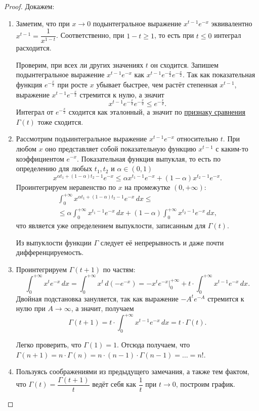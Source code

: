 \begin{proof}
	Докажем:
	\begin{enumerate}
		\item Заметим, что при \(x \to 0\) подынтегральное выражение \(x^{t - 1} e^{-x}\) эквивалентно \(x^{t - 1} = \dfrac{1}{x^{1 - t}}\). Соответственно, при \(1 - t \geqslant 1\), то есть при \(t \leqslant 0\) интеграл расходится.
		
		Проверим, при всех ли других значениях \(t\) он сходится. Запишем подынтегральное выражение \(x^{t - 1} e^{-x}\) как \(x^{t - 1} e^{-\frac{x}{2}} e^{-\frac{x}{2}}\). Так как показательная функция \(e^{-\frac{x}{2}}\) при росте \(x\) убывает быстрее, чем растёт степенная \(x^{t - 1}\), выражение \(x^{t - 1} e^{-\frac{x}{2}}\) стремится к нулю, а значит \[
			x^{t - 1} e^{-\frac{x}{2}} e^{-\frac{x}{2}} \leqslant  e^{-\frac{x}{2}}.
		\]
		Интеграл от \(e^{-\frac{x}{2}}\) сходится как эталонный, а значит по \hyperlink{priz}{признаку сравнения} \(\Gamma(t)\) тоже сходится.
		\item Рассмотрим подыинтегральное выражение \(x^{t - 1} e^{-x}\) относительно \(t\). При любом \(x\) оно представляет собой показательную функцию \(x^{t - 1}\) с каким-то коэффициентом \(e^{-x}\).
		Показательная функция выпуклая, то есть по определению для любых \(t_1, t_2\) и \(\alpha \in (0, 1)\) \[
			x^{\alpha t_1 + (1 - \alpha) t_2 - 1} e^{-x} \leqslant \alpha x^{t_1 - 1} e^{-x} + (1 - \alpha) x^{t_2 - 1} e^{-x}.
		\]
		Проинтегрируем неравенство по \(x\) на промежутке \((0, +\infty)\): 
		\begin{multline*}
			\int_0^{+\infty} x^{\alpha t_1 + (1 - \alpha) t_2 - 1} e^{-x} \, dx \leqslant \\
			\leqslant \alpha \int_0^{+\infty} x^{t_1 - 1} e^{-x} \, dx + (1 - \alpha) \int_0^{+\infty} x^{t_2 - 1} e^{-x} \, dx,
		\end{multline*}
		что является уже определением выпуклости, записанным для \(\Gamma(t)\).
		\begin{remark}
			Из выпуклости функции \(\Gamma\) следует её непрерывность и даже почти дифференцируемость.
		\end{remark}
		\item Проинтегрируем \(\Gamma(t + 1)\) по частям: \[
			\int_{0}^{+\infty} x^t e^{-x} \, dx = \int_{0}^{+\infty} x^t \, d(-e^{-x}) = -x^t e^{-x} \bigg|_0^{+\infty} + t \cdot \int_{0}^{+\infty} x^{t - 1} e^{-x} \, dx.
		\]
		Двойная подстановка зануляется, так как выражение \(-A^t e^{-A}\) стремится к нулю при \(A \to \infty\), а значит, получаем \[
			\Gamma(t + 1) = t \cdot \int_{0}^{+\infty} x^{t - 1} e^{-x} \, dx = t \cdot \Gamma(t).
		\]
		\begin{remark}
			Легко проверить, что \(\Gamma(1) = 1\). Отсюда получаем, что \(\Gamma(n + 1) = n \cdot \Gamma(n) = n \cdot (n - 1) \cdot \Gamma(n - 1) = \ldots = n!\).
		\end{remark}
		\item Пользуясь соображениями из предыдущего замечания, а также тем фактом, что \(\Gamma(t) = \dfrac{\Gamma(t + 1)}{t}\) ведёт себя как \(\dfrac{1}{t}\) при \(t \to 0\), построим график.
		

\end{enumerate}
\end{proof}

